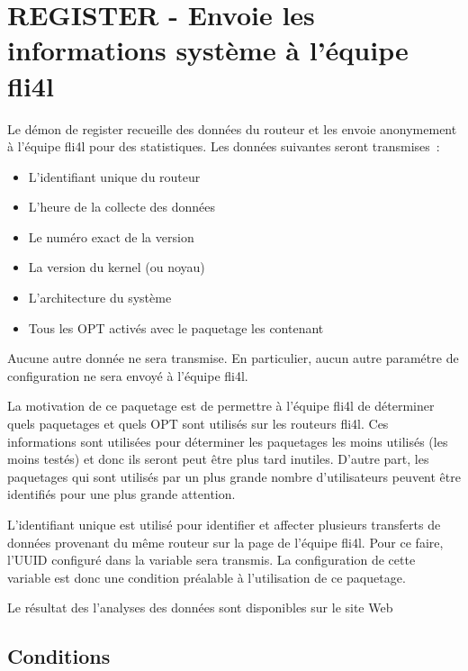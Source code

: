 
\section{REGISTER - Envoie les informations système à l'équipe fli4l}

Le démon de register recueille des données du routeur et les envoie
anonymement à l'équipe fli4l pour des statistiques. Les données suivantes
seront transmises~:

\begin{itemize}
\item L'identifiant unique du routeur
\item L'heure de la collecte des données
\item Le numéro exact de la version 
\item La version du kernel (ou noyau)
\item L'architecture du système
\item Tous les OPT activés avec le paquetage les contenant
\end{itemize}

Aucune autre donnée ne sera transmise. En particulier, aucun autre paramétre
de configuration ne sera envoyé à l'équipe fli4l.

La motivation de ce paquetage est de permettre à l'équipe fli4l de déterminer
quels paquetages et quels OPT sont utilisés sur les routeurs fli4l. Ces informations
sont utilisées pour déterminer les paquetages les moins utilisés (les moins testés)
et donc ils seront peut être plus tard inutiles. D'autre part, les paquetages qui
sont utilisés par un plus grande nombre d'utilisateurs peuvent être identifiés pour
une plus grande attention.

L'identifiant unique est utilisé pour identifier et affecter plusieurs transferts de
données provenant du même routeur sur la page de l'équipe fli4l. Pour ce faire, l'UUID
configuré dans la variable  sera transmis. La configuration de cette
variable est donc une condition préalable à l'utilisation de ce paquetage.

Le résultat des l'analyses des données sont disponibles sur le site Web

\subsection{Conditions}

